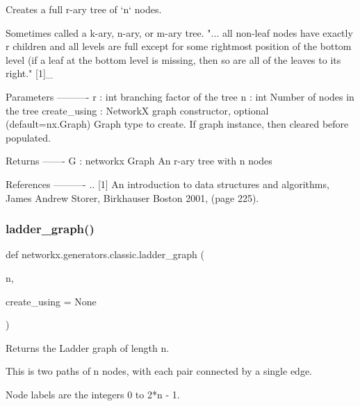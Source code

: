 \begin{DoxyVerb}Creates a full r-ary tree of `n` nodes.

Sometimes called a k-ary, n-ary, or m-ary tree.
"... all non-leaf nodes have exactly r children and all levels
are full except for some rightmost position of the bottom level
(if a leaf at the bottom level is missing, then so are all of the
leaves to its right." [1]_

Parameters
----------
r : int
    branching factor of the tree
n : int
    Number of nodes in the tree
create_using : NetworkX graph constructor, optional (default=nx.Graph)
   Graph type to create. If graph instance, then cleared before populated.

Returns
-------
G : networkx Graph
    An r-ary tree with n nodes

References
----------
.. [1] An introduction to data structures and algorithms,
       James Andrew Storer,  Birkhauser Boston 2001, (page 225).
\end{DoxyVerb}
 \mbox{\label{namespacenetworkx_1_1generators_1_1classic_ab8cf6c6f6623688eb5ceda3a39eb11ec}} 
\subsubsection{\texorpdfstring{ladder\+\_\+graph()}{ladder\_graph()}}
{\footnotesize\ttfamily def networkx.\+generators.\+classic.\+ladder\+\_\+graph (\begin{DoxyParamCaption}\item[{}]{n,  }\item[{}]{create\+\_\+using = {\ttfamily None} }\end{DoxyParamCaption})}

\begin{DoxyVerb}Returns the Ladder graph of length n.

This is two paths of n nodes, with
each pair connected by a single edge.

Node labels are the integers 0 to 2*n - 1.\end{DoxyVerb}
 \mbox{\label{namespacenetworkx_1_1generators_1_1classic_a8db7a0434f8dd414559287edd0a65957}} 
